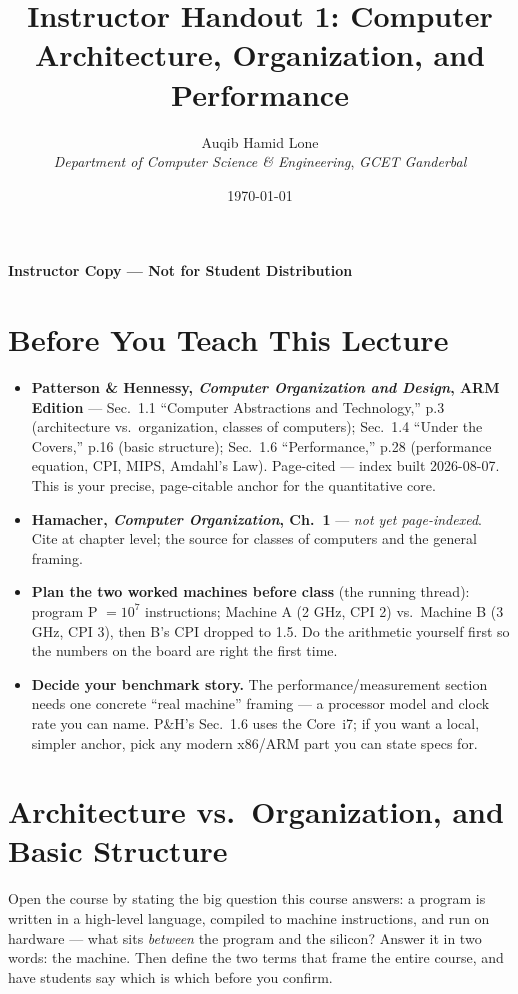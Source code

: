 \documentclass[11pt]{article}
\title{Instructor Handout 1: Computer Architecture, Organization, and Performance}
\author{Auqib Hamid Lone\\[0.3em]
  \emph{Department of Computer Science \& Engineering}, \emph{GCET Ganderbal}}
\date{\today}
\begin{document}
\maketitle
{\centering\large\color{negative}\textbf{Instructor Copy --- Not for Student Distribution}\par}
\vspace{0.5cm}

\section{Before You Teach This Lecture}

\begin{itemize}
  \item \textbf{Patterson \& Hennessy, \textit{Computer Organization and Design}, ARM Edition} --- Sec.~1.1 ``Computer Abstractions and Technology,'' p.3 (architecture vs.\ organization, classes of computers); Sec.~1.4 ``Under the Covers,'' p.16 (basic structure); Sec.~1.6 ``Performance,'' p.28 (performance equation, CPI, MIPS, Amdahl's Law). Page-cited --- index built 2026-08-07. This is your precise, page-citable anchor for the quantitative core.
  \item \textbf{Hamacher, \textit{Computer Organization}, Ch.~1} --- \emph{not yet page-indexed}. Cite at chapter level; the source for classes of computers and the general framing.
  \item \textbf{Plan the two worked machines before class} (the running thread): program P $= 10^7$ instructions; Machine A (2 GHz, CPI 2) vs.\ Machine B (3 GHz, CPI 3), then B's CPI dropped to 1.5. Do the arithmetic yourself first so the numbers on the board are right the first time.
  \item \textbf{Decide your benchmark story.} The performance/measurement section needs one concrete ``real machine'' framing --- a processor model and clock rate you can name. P\&H's Sec.~1.6 uses the Core~i7; if you want a local, simpler anchor, pick any modern x86/ARM part you can state specs for.
\end{itemize}

\section{Architecture vs.\ Organization, and Basic Structure}

Open the course by stating the big question this course answers: a program is written in a high-level language, compiled to machine instructions, and run on hardware --- what sits \emph{between} the program and the silicon? Answer it in two words: the machine. Then define the two terms that frame the entire course, and have students say which is which before you confirm.
\end{document}
